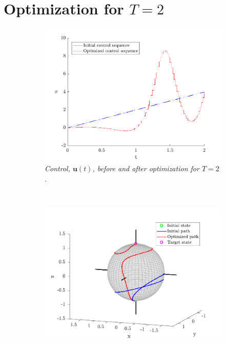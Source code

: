 \section{Optimization for $T = 2$ }
\begin{figure}[h!]
    \centering
    \begin{subfigure}[t]{0.49\textwidth}
        \includegraphics[width=\textwidth]{Figures/control2.pdf}
        \caption{\textit{Control, $\boldsymbol{u}(t)$, before and after optimization for $T = 2$.}}
        \label{fig:control2}
    \end{subfigure}
    ~
    \begin{subfigure}[t]{0.49\textwidth}
        \includegraphics[width=\textwidth]{Figures/path2.pdf}

\end{subfigure}
\end{figure}
